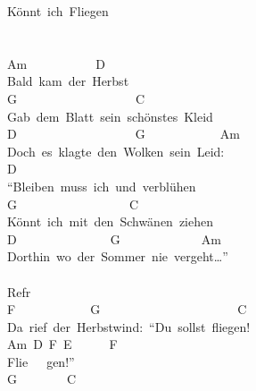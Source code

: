\documentclass[]{book}
\begin{document}
Könnt~ich~Fliegen\\
~\\
~\\
Am~~~~~~~~~~~D\\
Bald~kam~der~Herbst\\
G~~~~~~~~~~~~~~~~~~~C\\
Gab~dem~Blatt~sein~schönstes~Kleid\\
D~~~~~~~~~~~~~~~~~~~G~~~~~~~~~~~~Am\\
Doch~es~klagte~den~Wolken~sein~Leid:\\
\hspace*{0.333em}\hspace*{0.333em}\hspace*{0.333em}\hspace*{0.333em}\hspace*{0.333em}\hspace*{0.333em}\hspace*{0.333em}\hspace*{0.333em}\hspace*{0.333em}\hspace*{0.333em}\hspace*{0.333em}\hspace*{0.333em}\hspace*{0.333em}\hspace*{0.333em}\hspace*{0.333em}\hspace*{0.333em}\hspace*{0.333em}\hspace*{0.333em}\hspace*{0.333em}D\\
``Bleiben~muss~ich~und~verblühen\\
G~~~~~~~~~~~~~~~~~~C\\
Könnt~ich~mit~den~Schwänen~ziehen\\
D~~~~~~~~~~~~~~~G~~~~~~~~~~~~~Am\\
Dorthin~wo~der~Sommer~nie~vergeht\ldots{}''\\
~\\
Refr\\
F~~~~~~~~~~~~G~~~~~~~~~~~~~~~~~~~~~~C\\
Da~rief~der~Herbstwind:~``Du~sollst~fliegen!~\\
Am~D~F~E~~~~~~F\\
Flie~~~gen!''\\
\hspace*{0.333em}\hspace*{0.333em}\hspace*{0.333em}\hspace*{0.333em}\hspace*{0.333em}\hspace*{0.333em}\hspace*{0.333em}G~~~~~~~~C~~~~~~~~~~~~~~~~~~~~~\\
\end{document}
